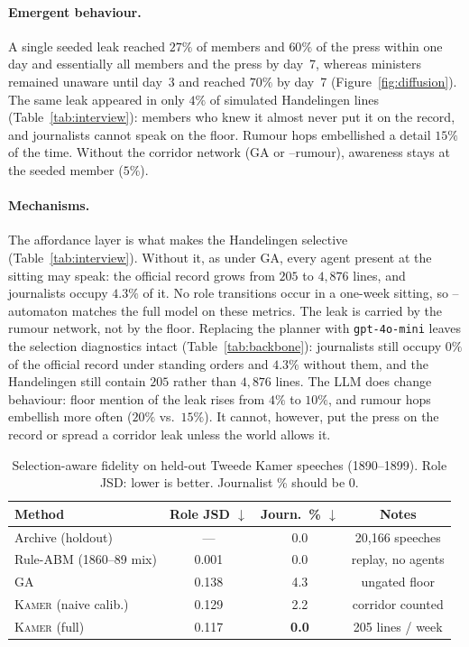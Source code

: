 \documentclass[sigconf,review,anonymous]{acmart}
\newcommand{\sys}{\textsc{Kamer}}
\begin{document}
\paragraph{Emergent behaviour.} A single seeded leak reached $27\%$ of
members and $60\%$ of the press within one day and essentially all members
and the press by day~7, whereas ministers remained unaware until day~3 and
reached $70\%$ by day~7 (Figure~\ref{fig:diffusion}). The same leak
appeared in only $4\%$ of simulated Handelingen lines
(Table~\ref{tab:interview}): members who knew it almost never put it on
the record, and journalists cannot speak on the floor. Rumour hops
embellished a detail $15\%$ of the time. Without the corridor network (GA
or --rumour), awareness stays at the seeded member ($5\%$).

\paragraph{Mechanisms.} The affordance layer is what makes the
Handelingen selective (Table~\ref{tab:interview}). Without it, as under
GA, every agent present at the sitting may speak: the official record grows
from $205$ to $4{,}876$ lines, and journalists occupy $4.3\%$ of it. No
role transitions occur in a one-week sitting, so --automaton matches the
full model on these metrics. The leak is carried by the rumour network,
not by the floor. Replacing the planner with \texttt{gpt-4o-mini} leaves
the selection diagnostics intact (Table~\ref{tab:backbone}): journalists
still occupy $0\%$ of the official record under standing orders and
$4.3\%$ without them, and the Handelingen still contain $205$ rather than
$4{,}876$ lines. The LLM does change behaviour: floor mention of the leak
rises from $4\%$ to $10\%$, and rumour hops embellish more often ($20\%$
vs.\ $15\%$). It cannot, however, put the press on the record or spread a
corridor leak unless the world allows it.

\begin{table}[t]
\caption{Selection-aware fidelity on held-out Tweede Kamer speeches
(1890--1899). Role JSD: lower is better. Journalist \% should be $0$.}
\label{tab:main}
\centering\small
\setlength{\tabcolsep}{4pt}
\begin{tabular}{lccc}
\toprule
Method & Role JSD $\downarrow$ & Journ.\ \% $\downarrow$ & Notes \\
\midrule
Archive (holdout) & --- & 0.0 & 20{,}166 speeches \\
Rule-ABM (1860--89 mix) & 0.001 & 0.0 & replay, no agents \\
GA~\cite{park2023generative} & 0.138 & 4.3 & ungated floor \\
\sys{} (naive calib.) & 0.129 & 2.2 & corridor counted \\
\sys{} (full) & 0.117 & \textbf{0.0} & 205 lines / week \\
\bottomrule
\end{tabular}
\end{table}
\end{document}
